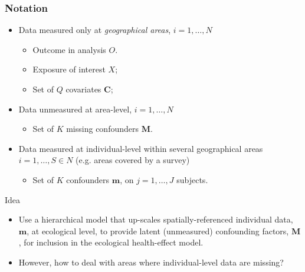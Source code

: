 \documentclass[slidestop,compress,serif,10pt]{beamer}
\begin{document}
\begin{frame}
\frametitle{Notation}
\begin{itemize}
\item \vfill Data measured only at \emph{geographical areas}, $i=1, \dots, N$
\begin{itemize}
  \item \vfill Outcome in analysis $O$.
  \item \vfill Exposure of interest $X$;
    \item \vfill Set of $Q$ covariates $\boldsymbol{C}$;

  \end{itemize}
\pause \item \vfill Data unmeasured at area-level, $i=1, \dots, N$
\begin{itemize}
\vfill \item Set of $K$ missing confounders $\boldsymbol{M}$.
\end{itemize}
\pause\item \vfill Data measured at individual-level within several geographical areas $i=1, \dots, S \in N$ (e.g. areas covered by a survey)
  \begin{itemize}
  \vfill \item Set of $K$ confounders $\boldsymbol{m}$, on $j=1,\dots, J$ subjects.
\end{itemize}
\end{itemize}

\pause\begin{block} {\centering Idea}
  \begin{itemize}
\item \vfill Use a hierarchical model that up-scales spatially-referenced individual data, $\boldsymbol{m}$, at ecological level, to provide latent (unmeasured) confounding factors, $\boldsymbol{M}$, for inclusion in the ecological health-effect model.
\item \vfill However, how to deal with areas where individual-level data are missing?
\end{itemize}
\end{block}
\end{frame}
\end{document}
